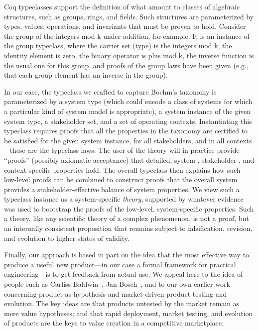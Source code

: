 \documentclass[conference]{IEEEtran}
\begin{document}
Coq typeclasses support the definition of what amount to classes of algebraic structures, such as groups, rings, and fields. Such structures are parameterized by types, values, operations, and invariants that must be proven to hold.  Consider the group of the integers mod k under addition, for example. It is an instance of the group typeclass, where the carrier set (type) is the integers mod k, the identity element is zero, the binary operator is plus mod k, the inverse function is the usual one for this group, and proofs of the group laws have been given (e.g., that each group element has an inverse in the group).  

In our case, the typeclass we crafted to capture Boehm's taxonomy is parameterized by a system type (which could encode a class of systems for which a particular kind of system model is appropriate), a system instance of the given system type, a stakeholder set, and a set of operating contexts. Instantiating this typeclass requires proofs that all the properties in the taxonomy are certified to be satisfied for the given system instance, for all stakeholders, and in all contexts -- these are the typeclass laws. The user of the theory will in practice provide ``proofs'' (possibly axiomatic acceptance) that detailed, system-, stakeholder-, and context-specific properties hold. The overall typeclass then explains how such low-level proofs can be combined to construct proofs that the overall system provides a stakeholder-effective balance of system properties. We view such a typeclass instance as a system-specific {\em theory}, supported by whatever evidence was used to bootstrap the proofs of the low-level, system-specific properties. Such a theory, like any scientific theory of a complex phenomenon, is not a proof, but an internally consistent proposition that remains subject to falsification, revision, and evolution to higher states of validity. 

Finally, our approach is based in part on the idea that the most effective way to produce a useful new product---in our case a formal framework for practical engineering---is to get feedback from actual use. We appeal here to the idea of people such as Carliss Baldwin~\cite{design-rules}, Jan Bosch~\cite{qcon-2012-talk}, and to our own earlier work~\cite{sullivan-structure-and-value} concerning product-as-hypothesis and market-driven product testing and evolution. The key ideas are that products untested by the market remain as mere value hypotheses; and that rapid deployment, market testing, and evolution of products are the keys to value creation in a competitive marketplace. 
\end{document}
